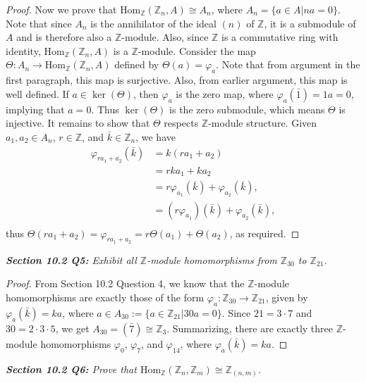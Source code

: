 \documentclass{article}
\begin{document}
\begin{proof}
    Now we prove that $\text{Hom}_{\mathbb{Z}}(\mathbb{Z}_n,A)\cong A_n$,
    where $A_n=\{a\in A|na=0\}$. Note that since $A_n$ is the annihilator
    of the ideal $(n)$ of $\mathbb{Z}$, it is a submodule of $A$ and is
    therefore also a $\mathbb{Z}$-module. Also, since $\mathbb{Z}$ is a
    commutative ring with identity,
    $\text{Hom}_{\mathbb{Z}}(\mathbb{Z}_n,A)$ is a $\mathbb{Z}$-module.
    Consider the map $\Theta:A_n\rightarrow
    \text{Hom}_{\mathbb{Z}}(\mathbb{Z}_n,A)$ defined by
    $\Theta(a)=\varphi_a$. Note that from argument in the first paragraph,
    this map is surjective. Also, from earlier argument, this map is well
    defined. If $a\in\ker(\Theta)$, then $\varphi_a$ is the zero map, where
    $\varphi_a(\bar{1})=1a=0$, implying that $a=0$. Thus $\ker(\Theta)$ is
    the zero submodule, which means $\Theta$ is injective. It remains to
    show that $\Theta$ respects $\mathbb{Z}$-module structure. Given
    $a_1,a_2\in A_n$, $r\in\mathbb{Z}$, and $\bar{k}\in\mathbb{Z}_n$, we
    have
    \begin{align*}
      \varphi_{ra_1+a_2}(\bar{k}) &=k(ra_1+a_2) \\
      &=rka_1+ka_2 \\
      &=r\varphi_{a_1}(\bar{k})+\varphi_{a_2}(\bar{k}), \\
      &=(r\varphi_{a_1})(\bar{k})+\varphi_{a_2}(\bar{k}), \\
    \end{align*}
    thus $\Theta(ra_1+a_2) =\varphi_{ra_1+a_2} =r\Theta(a_1)+\Theta(a_2)$,
    as required.
  \end{proof}

\it \textbf{Section 10.2 Q5:} Exhibit all $\mathbb{Z}$-module homomorphisms
  from $\mathbb{Z}_{30}$ to $\mathbb{Z}_{21}$.

  \begin{proof}
    From Section 10.2 Question 4, we know that the $\mathbb{Z}$-module
    homomorphisms are exactly those of the form
    $\varphi_a:\mathbb{Z}_{30}\rightarrow\mathbb{Z}_{21}$, given by
    $\varphi_a(\bar{k})=ka$, where $a\in
    A_{30}:=\{a\in\mathbb{Z}_{21}|30a=0\}$. Since $21=3\cdot7$ and
    $30=2\cdot3\cdot5$, we get $A_{30}=(\bar{7})\cong\mathbb{Z}_3$.
    Summarizing, there are exactly three $\mathbb{Z}$-module homomorphisms
    $\varphi_0$, $\varphi_7$, and $\varphi_{14}$, where
    $\varphi_a(\bar{k})=ka$.
  \end{proof}

\it \textbf{Section 10.2 Q6:} Prove that
  $\text{Hom}_{\mathbb{Z}}(\mathbb{Z}_n,\mathbb{Z}_m)
  \cong\mathbb{Z}_{(n,m)}$.
\end{document}
